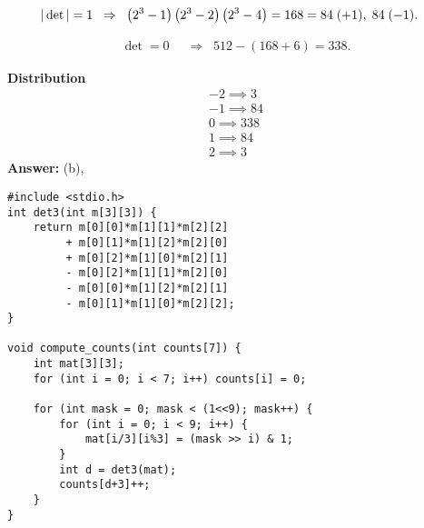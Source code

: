 \documentclass{beamer}
\numberwithin{equation}{section}
\begin{document}
\begin{align}
|\det|=1 &\;\;\Rightarrow\;\;
	\left(2^3-1\right)\left(2^3-2\right)\left(2^3-4\right)=168
=84 \;(+1),\; 84 \;(-1).
\end{align}

\begin{align}
\det=0 &\;\;\Rightarrow\;\; 512-(168+6)=338.
\end{align}

\textbf{ Distribution}
\begin{align}
-2 \implies 3 \\
-1 \implies 84 \\
0 \implies 338 \\
1 \implies 84 \\
2 \implies 3
\end{align}
\textbf{Answer:} (b),
\begin{lstlisting}[caption={C code}]
#include <stdio.h>
int det3(int m[3][3]) {
    return m[0][0]*m[1][1]*m[2][2]
         + m[0][1]*m[1][2]*m[2][0]
         + m[0][2]*m[1][0]*m[2][1]
         - m[0][2]*m[1][1]*m[2][0]
         - m[0][0]*m[1][2]*m[2][1]
         - m[0][1]*m[1][0]*m[2][2];
}

void compute_counts(int counts[7]) {
    int mat[3][3];
    for (int i = 0; i < 7; i++) counts[i] = 0;

    for (int mask = 0; mask < (1<<9); mask++) {
        for (int i = 0; i < 9; i++) {
            mat[i/3][i%3] = (mask >> i) & 1;
        }
        int d = det3(mat);
        counts[d+3]++;
    }
}
\end{lstlisting}
\end{document}
